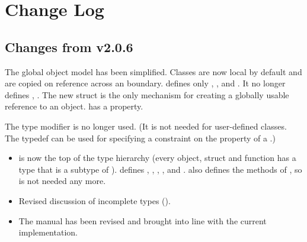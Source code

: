 \documentclass[12pt,twoside,notitlepage]{report}
\begin{document}


 

\clearpage

{\parskip 0pt
\addtolength{\cftsecnumwidth}{0.5em}
\addtolength{\cftsubsecnumwidth}{0.5em}
\addtolength{\cftsubsecindent}{0.5em}
\tableofcontents
}




	






	
	
	
	
	
	




\renewcommand{\bibname}{References}



%	


\clearpage


\appendix

\chapter{Change Log}
\section{Changes from \Xten{} v2.0.6}

The global object model has been simplified. Classes are now local by
default and are copied on reference across an  boundary.
  defines only , ,
 and . It no longer defines ,
.  The new struct  is the only
mechanism for creating a globally usable reference to an
object.  has a  property.

The type modifier \Xcd{!} is no longer used. (It is not needed for
user-defined classes. The typedef  can
be used for specifying a constraint  on the  property of a
.)

\begin{itemize}
\item {} is now the top of the type hierarchy (every object,
  struct and function has a type that is a subtype of
  ).  defines , , ,
  ,  and .  also defines the methods
  of , so  is not needed any more.
\item Revised discussion of incomplete types ().
\item The manual has been revised and brought into line with the current implementation. 
\end{itemize}
\end{document}
